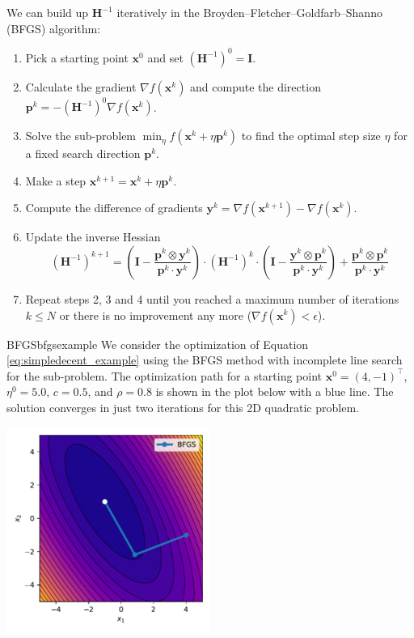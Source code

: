 We can build up $\mathbf{H}^{-1}$ iteratively in the Broyden–Fletcher–Goldfarb–Shanno (BFGS) \cite{Broyden1970, Fletcher1970, Goldfarb1970, Shanno1970} algorithm: 
\begin{enumerate}
    \item Pick a starting point $\mathbf{x}^0$ and set $(\mathbf{H}^{-1})^0=\mathbf{I}$.
    \item Calculate the gradient $\nabla f(\mathbf{x}^k)$ and compute the direction $\mathbf{p}^k = - (\mathbf{H}^{-1})^0 \nabla f(\mathbf{x}^k)$.
    \item Solve the sub-problem $\min_{\eta} f(\mathbf{x}^k + \eta \mathbf{p}^k)$ to find the optimal step size $\eta$ for a fixed search direction $\mathbf{p}^k$.
    \item Make a step $\mathbf{x}^{k+1} = \mathbf{x}^k + \eta \mathbf{p}^k$.
    \item Compute the difference of gradients $ \mathbf{y}^k = \nabla f(\mathbf{x}^{k+1}) - \nabla f(\mathbf{x}^k)$.
    \item Update the inverse Hessian 
    \begin{equation}
        \nonumber
        (\mathbf{H}^{-1})^{k+1} = 
            \left(\mathbf{I} - \frac{\mathbf{p}^k \otimes \mathbf{y}^k}{\mathbf{p}^k \cdot \mathbf{y}^k} \right)
            \cdot
            (\mathbf{H}^{-1})^k
            \cdot
            \left(\mathbf{I} - \frac{\mathbf{y}^k \otimes \mathbf{p}^k}{\mathbf{p}^k \cdot \mathbf{y}^k} \right) 
            + 
            \frac{\mathbf{p}^k \otimes \mathbf{p}^k}{\mathbf{p}^k \cdot \mathbf{y}^k}
    \end{equation}
    \item Repeat steps 2, 3 and 4 until you reached a maximum number of iterations $k \le N$ or there is no improvement any more ($ \nabla f(\mathbf{x}^k) < \epsilon$). 
\end{enumerate}

\begin{example}{BFGS}{bfgsexample}
    We consider the optimization of Equation \eqref{eq:simpledecent_example} using the BFGS method with incomplete line search for the sub-problem. The optimization path for a starting point $\mathbf{x}^0= (4, -1)^\top$, $\eta^0=5.0$, $c=0.5$, and $\rho=0.8$ is shown in the plot below with a blue line. The solution converges in just two iterations for this 2D quadratic problem.
    \begin{center}
        \includegraphics[width=0.5\textwidth]{figures/bfgs.pdf}
    \end{center}   
\end{example}



 


